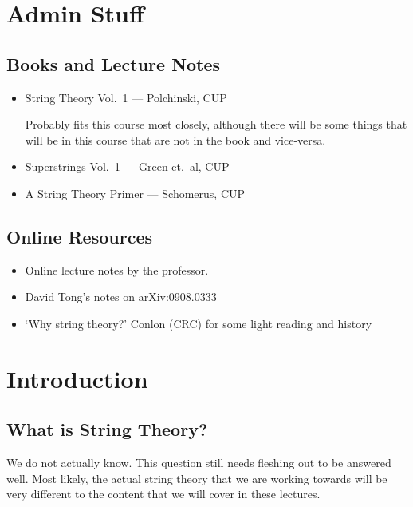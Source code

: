 
\chapter*{Admin Stuff}%

\section*{Books and Lecture Notes}%

\begin{itemize}
  \item String Theory Vol.~1 --- Polchinski, CUP

  Probably fits this course most closely, although there will be some things that will be in this course that are not in the book and vice-versa.

  \item Superstrings Vol.~1 --- Green et.~al, CUP

  \item A String Theory Primer --- Schomerus, CUP
\end{itemize}

\section*{Online Resources}%

\begin{itemize}
  \item Online lecture notes by the professor.
  \item David Tong's notes on arXiv:0908.0333
  \item `Why string theory?' Conlon (CRC) for some light reading and history
\end{itemize}

\chapter{Introduction}%
\label{cha:introduction}

\section{What is String Theory?}%
\label{sec:what_is_string_theory_}

We do not actually know. This question still needs fleshing out to be answered well.
Most likely, the actual string theory that we are working towards will be very different to the content that we will cover in these lectures.

